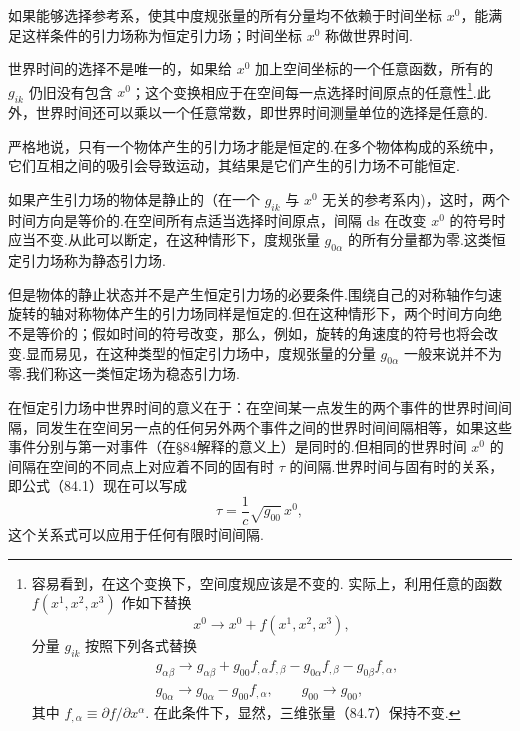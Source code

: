 如果能够选择参考系，使其中度规张量的所有分量均不依赖于时间坐标 $x^0$，能满足这样条件的引力场称为恒定引力场；时间坐标 $x^0$ 称做世界时间.

世界时间的选择不是唯一的，如果给 $x^0$ 加上空间坐标的一个任意函数，所有的 $g_{ik}$ 仍旧没有包含 $x^0$；这个变换相应于在空间每一点选择时间原点的任意性\footnote{容易看到，在这个变换下，空间度规应该是不变的. 实际上，利用任意的函数 $f(x^1,x^2,x^3)$ 作如下替换
\begin{equation*}
  x^0\to x^0+f(x^1,x^2,x^3),
\end{equation*}
分量 $g_{ik}$ 按照下列各式替换
\begin{equation*}
\begin{aligned}
  &g_{\alpha\beta}\to g_{\alpha\beta}+g_{00}f_{,\alpha}f_{,\beta}
  -g_{0\alpha}f_{,\beta}-g_{0\beta}f_{,\alpha},\\
  &g_{0\alpha}\to g_{0\alpha}-g_{00}f_{,\alpha},\qquad g_{00}\to g_{00},
\end{aligned}
\end{equation*}
其中 $f_{,\alpha}\equiv\partial f/\partial x^{\alpha}$. 在此条件下，显然，三维张量（84.7）保持不变.}.此外，世界时间还可以乘以一个任意常数，即世界时间测量单位的选择是任意的.

严格地说，只有一个物体产生的引力场才能是恒定的.在多个物体构成的系统中，它们互相之间的吸引会导致运动，其结果是它们产生的引力场不可能恒定.

如果产生引力场的物体是静止的（在一个 $g_{ik}$ 与 $x^0$ 无关的参考系内)，这时，两个时间方向是等价的.在空间所有点适当选择时间原点，间隔 ds 在改变 $x^0$ 的符号时应当不变.从此可以断定，在这种情形下，度规张量 $g_{0\alpha}$ 的所有分量都为零.这类恒定引力场称为静态引力场.

但是物体的静止状态并不是产生恒定引力场的必要条件.围绕自己的对称轴作匀速旋转的轴对称物体产生的引力场同样是恒定的.但在这种情形下，两个时间方向绝不是等价的；假如时间的符号改变，那么，例如，旋转的角速度的符号也将会改变.显而易见，在这种类型的恒定引力场中，度规张量的分量 $g_{0\alpha}$ 一般来说并不为零.我们称这一类恒定场为稳态引力场.

在恒定引力场中世界时间的意义在于：在空间某一点发生的两个事件的世界时间间隔，同发生在空间另一点的任何另外两个事件之间的世界时间间隔相等，如果这些事件分别与第一对事件（在§84解释的意义上）是同时的.但相同的世界时间 $x^0$ 的间隔在空间的不同点上对应着不同的固有时 $\tau$ 的间隔.世界时间与固有时的关系，即公式（84.1）现在可以写成
\begin{equation}
  \tau=\frac{1}{c}\sqrt{g_{00}}\,x^0,
\end{equation}
这个关系式可以应用于任何有限时间间隔.

